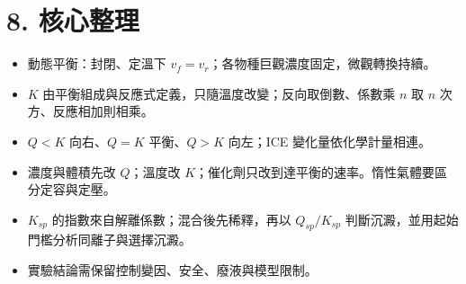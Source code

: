 \documentclass[11pt,a4paper]{article}
\providecommand{\tightlist}{%
  \setlength{\itemsep}{0pt}\setlength{\parskip}{0pt}}
\begin{document}
\section{8. 核心整理}\label{ux6838ux5fc3ux6574ux7406}

\begin{itemize}
\tightlist
\item
  動態平衡：封閉、定溫下 \(v_f=v_r\)；各物種巨觀濃度固定，微觀轉換持續。
\item
  \(K\) 由平衡組成與反應式定義，只隨溫度改變；反向取倒數、係數乘 \(n\) 取 \(n\) 次方、反應相加則相乘。
\item
  \(Q<K\) 向右、\(Q=K\) 平衡、\(Q>K\) 向左；ICE 變化量依化學計量相連。
\item
  濃度與體積先改 \(Q\)；溫度改 \(K\)；催化劑只改到達平衡的速率。惰性氣體要區分定容與定壓。
\item
  \(K_{sp}\) 的指數來自解離係數；混合後先稀釋，再以 \(Q_{sp}/K_{sp}\) 判斷沉澱，並用起始門檻分析同離子與選擇沉澱。
\item
  實驗結論需保留控制變因、安全、廢液與模型限制。
\end{itemize}
\end{document}
